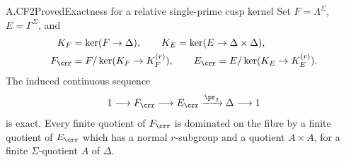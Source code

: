 \begin{claim}{A.CF2}{Proved}{Exactness for a relative single-prime cusp kernel}
Set $F=\Lambda^\Sigma$, $E=\Gamma^\Sigma$, and
\[
 \begin{split}
 K_F&=\ker(F\to\Delta),\qquad
 K_E=\ker(E\to\Delta\times\Delta),\\
 F_{\crr}&=F/\ker(K_F\to K_F^{(r)}),\qquad
 E_{\crr}=E/\ker(K_E\to K_E^{(r)}).
 \end{split}
\]
The induced continuous sequence
\[
 1\longrightarrow F_{\crr}\longrightarrow E_{\crr}
       \xrightarrow{\pr_2}\Delta\longrightarrow1
\]
is exact. Every finite quotient of $F_{\crr}$ is dominated on the
fibre by a finite quotient of $E_{\crr}$ which has a normal $r$-subgroup
and a quotient $A\times A$, for a finite $\Sigma$-quotient $A$ of
$\Delta$.
\end{claim}
